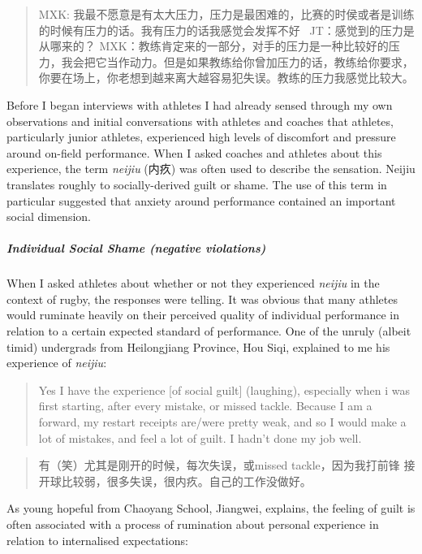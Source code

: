 \begin{CJK}{UTF8}{gbsn}
    \begin{quotation}
      MXK: 我最不愿意是有太大压力，压力是最困难的，比赛的时侯或者是训练的时候有压力的话。我有压力的话我感觉会发挥不好 
      JT：感觉到的压力是从哪来的？
      MXK：教练肯定来的一部分，对手的压力是一种比较好的压力，我会把它当作动力。但是如果教练给你曾加压力的话，教练给你要求，你要在场上，你老想到越来离大越容易犯失误。教练的压力我感觉比较大。
    \end{quotation}

  Before I began interviews with athletes I had already sensed through my own observations and initial conversations with athletes and coaches that athletes, particularly junior athletes, experienced high levels of discomfort and pressure around on-field performance. When I asked coaches and athletes about this experience, the term \textit{neijiu} (内疚) was often used to describe the sensation.  Neijiu translates roughly to socially-derived guilt or shame.  The use of this term in particular suggested that anxiety around performance contained an important social dimension.

\subparagraph{Individual Social Shame (negative violations)}
  When I asked athletes about whether or not they experienced \textit{neijiu} in the context of rugby, the responses were telling.  It was obvious that many athletes would ruminate heavily on their perceived quality of individual performance in relation to a certain expected standard of performance.  One of the unruly (albeit timid) undergrads from Heilongjiang Province, Hou Siqi, explained to me his experience of \textit{neijiu}:

      \begin{quotation}
        Yes I have the experience [of social guilt] (laughing), especially when i was first starting, after every mistake, or missed tackle.  Because I am a forward, my restart receipts are/were pretty weak, and so I would make a lot of mistakes, and feel a lot of guilt.  I hadn't done my job well.
      \end{quotation}

      \begin{quotation}
        有（笑）尤其是刚开的时候，每次失误，或missed tackle，因为我打前锋 接开球比较弱，很多失误，很内疚。自己的工作没做好。 
      \end{quotation}

As young hopeful from Chaoyang School, Jiangwei, explains, the feeling of guilt is often associated with a process of rumination about personal experience in relation to internalised expectations:


\end{CJK}
